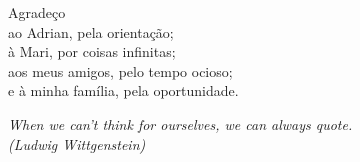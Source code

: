 \begin{agradecimentos}

  Agradeço \\
  ao Adrian, pela orientação; \\
  à Mari, por coisas infinitas; \\
  aos meus amigos, pelo tempo ocioso; \\
  e à minha família, pela oportunidade.

\end{agradecimentos}

\begin{epigrafe}
    \vspace*{\fill}
	\begin{flushright}
		\textit{
      When we can't think for ourselves, we can always quote. \\
      (Ludwig Wittgenstein)
    }
	\end{flushright}
\end{epigrafe}


